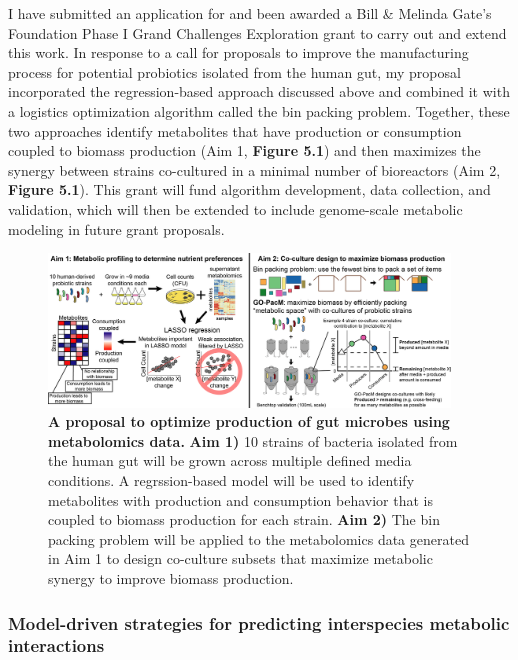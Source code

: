 \documentclass[11pt,twocolumn,notitlepage,openany,twoside]{book}
\begin{document}
\begin{refsection}
I have submitted an application for and been awarded a Bill \& Melinda Gate's Foundation Phase I Grand Challenges Exploration grant to carry out and extend this work. In response to a call for proposals to improve the manufacturing process for potential probiotics isolated from the human gut, my proposal incorporated the regression-based approach discussed above and combined it with a logistics optimization algorithm called the bin packing problem. Together, these two approaches identify metabolites that have production or consumption coupled to biomass production (Aim 1, \textbf{Figure 5.1}) and then maximizes the synergy between strains co-cultured in a minimal number of bioreactors (Aim 2, \textbf{Figure 5.1}). This grant will fund algorithm development, data collection, and validation, which will then be extended to include genome-scale metabolic modeling in future grant proposals.

\begin{figure}[!tb]
\centering
\includegraphics[width=0.95\textwidth]{ch5_fig1}
\caption[ A proposal to optimize production of gut microbes using metabolomics data.]{\textbf{ A proposal to optimize production of gut microbes using metabolomics data.}  \textbf{Aim 1)} 10 strains of bacteria isolated from the human gut will be grown across multiple defined media conditions. A regrssion-based model will be used to identify metabolites with production and consumption behavior that is coupled to biomass production for each strain. \textbf{Aim 2)} The bin packing problem will be applied to the metabolomics data generated in Aim 1 to design co-culture subsets that maximize metabolic synergy to improve biomass production.}
\end{figure}

\subsubsection{Model-driven strategies for predicting interspecies metabolic interactions}


\end{refsection}
\end{document}
